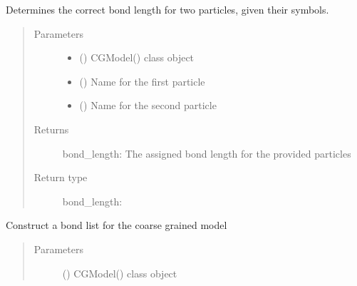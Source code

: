 \documentclass[letterpaper,12pt,english,openany,oneside]{sphinxmanual}
\begin{document}
\begin{fulllineitems}
\begin{fulllineitems}
\label{\detokenize{cg_model:cg_model.cgmodel.CGModel.get_bond_length_from_names}}
Determines the correct bond length for two particles, given their symbols.
\begin{quote}\begin{description}
\item[{Parameters}] \leavevmode\begin{itemize}
\item {} 
 () \textendash{} CGModel() class object

\item {} 
 () \textendash{} Name for the first particle

\item {} 
 () \textendash{} Name for the second particle

\end{itemize}

\item[{Returns}] \leavevmode
bond\_length: The assigned bond length for the provided particles

\item[{Return type}] \leavevmode

bond\_length: 


\end{description}\end{quote}

\end{fulllineitems}


\begin{fulllineitems}
\label{\detokenize{cg_model:cg_model.cgmodel.CGModel.get_bond_list}}
Construct a bond list for the coarse grained model
\begin{quote}\begin{description}
\item[{Parameters}] \leavevmode
{} () \textendash{} CGModel() class object


\end{description}
\end{quote}
\end{fulllineitems}
\end{fulllineitems}
\end{document}
